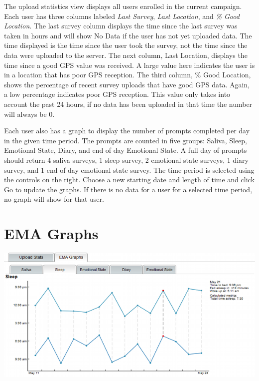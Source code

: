 \documentclass{article}
\begin{document}
The upload statistics view displays all users enrolled in the current
campaign.  Each user has three columns labeled \emph{Last Survey},
\emph{Last Location}, and \emph{\% Good Location}.  The last survey column
displays the time since the last survey was taken in hours and
will show No Data if the user has not yet uploaded data.  The time displayed
is the time since the user took the survey, not the time since the data were uploaded to the server.
The next column, Last Location, displays the time since a good GPS value was received.  A large
value here indicates the user is in a location that has poor GPS reception.  The third column, \% Good Location,
shows the percentage of recent survey uploads that have good GPS data.  Again, a low percentage indicates
poor GPS reception.  This value only takes into account the past 24 hours, if no data has been uploaded in that
time the number will always be 0.

Each user also has a graph to display the number of prompts completed per day in the given time period.
The prompts are counted in five groups: Saliva, Sleep, Emotional State, Diary, and end of day Emotional State.
A full day of prompts should return 4 saliva surveys, 1 sleep survey, 2 emotional state surveys, 1 diary survey, and 
1 end of day emotional state survey.  The time period is selected using the controls on the right.  Choose a new starting date
and length of time and click Go to update the graphs.  If there is no data for a user for a selected time period, no graph will show for that user.


\section{EMA Graphs}
\label{ema_graphs}
\begin{center}
	\includegraphics[width=6in]{ema-shrunk}
\end{center}
\end{document}
